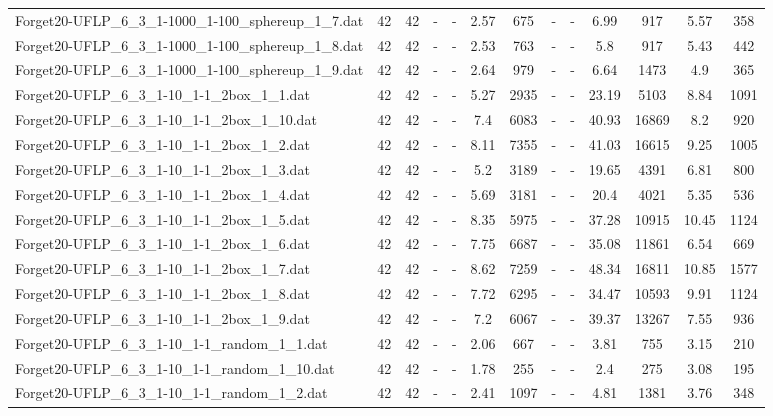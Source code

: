 \begin{table}[!ht]
{\begin{tabular}{lcccccccccccc}
Forget20-UFLP\_6\_3\_1-1000\_1-100\_sphereup\_1\_7.dat & 42 & 42 &  - &  - & 2.57 & 675 &  - &  - & 6.99 & 917 & 5.57 & 358 \\
Forget20-UFLP\_6\_3\_1-1000\_1-100\_sphereup\_1\_8.dat & 42 & 42 &  - &  - & 2.53 & 763 &  - &  - & 5.8 & 917 & 5.43 & 442 \\
Forget20-UFLP\_6\_3\_1-1000\_1-100\_sphereup\_1\_9.dat & 42 & 42 &  - &  - & 2.64 & 979 &  - &  - & 6.64 & 1473 & 4.9 & 365 \\
Forget20-UFLP\_6\_3\_1-10\_1-1\_2box\_1\_1.dat & 42 & 42 &  - &  - & 5.27 & 2935 &  - &  - & 23.19 & 5103 & 8.84 & 1091 \\
Forget20-UFLP\_6\_3\_1-10\_1-1\_2box\_1\_10.dat & 42 & 42 &  - &  - & 7.4 & 6083 &  - &  - & 40.93 & 16869 & 8.2 & 920 \\
Forget20-UFLP\_6\_3\_1-10\_1-1\_2box\_1\_2.dat & 42 & 42 &  - &  - & 8.11 & 7355 &  - &  - & 41.03 & 16615 & 9.25 & 1005 \\
Forget20-UFLP\_6\_3\_1-10\_1-1\_2box\_1\_3.dat & 42 & 42 &  - &  - & 5.2 & 3189 &  - &  - & 19.65 & 4391 & 6.81 & 800 \\
Forget20-UFLP\_6\_3\_1-10\_1-1\_2box\_1\_4.dat & 42 & 42 &  - &  - & 5.69 & 3181 &  - &  - & 20.4 & 4021 & 5.35 & 536 \\
Forget20-UFLP\_6\_3\_1-10\_1-1\_2box\_1\_5.dat & 42 & 42 &  - &  - & 8.35 & 5975 &  - &  - & 37.28 & 10915 & 10.45 & 1124 \\
Forget20-UFLP\_6\_3\_1-10\_1-1\_2box\_1\_6.dat & 42 & 42 &  - &  - & 7.75 & 6687 &  - &  - & 35.08 & 11861 & 6.54 & 669 \\
Forget20-UFLP\_6\_3\_1-10\_1-1\_2box\_1\_7.dat & 42 & 42 &  - &  - & 8.62 & 7259 &  - &  - & 48.34 & 16811 & 10.85 & 1577 \\
Forget20-UFLP\_6\_3\_1-10\_1-1\_2box\_1\_8.dat & 42 & 42 &  - &  - & 7.72 & 6295 &  - &  - & 34.47 & 10593 & 9.91 & 1124 \\
Forget20-UFLP\_6\_3\_1-10\_1-1\_2box\_1\_9.dat & 42 & 42 &  - &  - & 7.2 & 6067 &  - &  - & 39.37 & 13267 & 7.55 & 936 \\
Forget20-UFLP\_6\_3\_1-10\_1-1\_random\_1\_1.dat & 42 & 42 &  - &  - & 2.06 & 667 &  - &  - & 3.81 & 755 & 3.15 & 210 \\
Forget20-UFLP\_6\_3\_1-10\_1-1\_random\_1\_10.dat & 42 & 42 &  - &  - & 1.78 & 255 &  - &  - & 2.4 & 275 & 3.08 & 195 \\
Forget20-UFLP\_6\_3\_1-10\_1-1\_random\_1\_2.dat & 42 & 42 &  - &  - & 2.41 & 1097 &  - &  - & 4.81 & 1381 & 3.76 & 348 \\

\end{tabular}}
\end{table}
